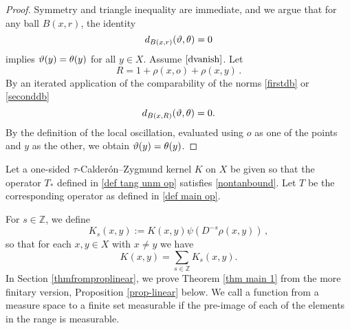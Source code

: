 \begin{proof}
    Symmetry and triangle inequality are immediate, and we argue that
for any ball $B(x,r)$, the identity
\begin{equation}\label{dvanish}
d_{B(x,r)}(\vartheta,\theta)=0
\end{equation}
implies $\vartheta(y)=\theta(y)$ for all $y\in X$. Assume $\eqref{dvanish}$.
Let
\begin{equation}
    R=1+\rho(x,o)+\rho(x,y)\, .
\end{equation}
By an iterated application of
the comparability of the norms \eqref{firstdb} or \eqref{seconddb} 
\begin{equation}
    d_{B(x,R)}(\vartheta,\theta)=0.
\end{equation}
By the definition of
the local oscillation, evaluated using $o$ as one of the points and $y$ as the other, we obtain
$\vartheta(y)=\theta(y)$.
\end{proof}

Let a one-sided $\tau$-Calder\'on--Zygmund kernel $K$ on $X$ be given so that the operator $T_*$ defined in \eqref{def tang unm op}
satisfies
\eqref{nontanbound}. Let $T$ be the corresponding operator as defined in \eqref{def main op}.


For $s\in\mathbb{Z}$, we define
\begin{equation}\label{defks}
    K_s(x,y):=K(x,y)\psi(D^{-s}\rho(x,y))\,,
\end{equation}
so that for each $x, y \in X$ with $x\neq y$  we have
$$K(x,y)=\sum_{s\in\mathbb{Z}}K_s(x,y).$$
    In Section \ref{thmfromproplinear}, we prove Theorem \ref{thm main 1}
    from the more finitary version, Proposition \ref{prop-linear} below. We call a function from a measure space to a finite set measurable if the pre-image of each of the elements in the range is measurable.

